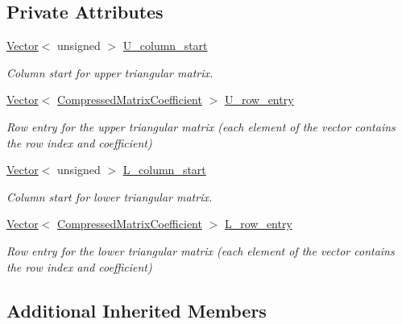 \subsection*{Private Attributes}
\begin{DoxyCompactItemize}
\item 
\hyperlink{classoomph_1_1Vector}{Vector}$<$ unsigned $>$ \hyperlink{classoomph_1_1ILUZeroPreconditioner_3_01CCDoubleMatrix_01_4_af67b6823d2b1bf0e4448405fd0e924bb}{U\+\_\+column\+\_\+start}
\begin{DoxyCompactList}\small\item\em Column start for upper triangular matrix. \end{DoxyCompactList}\item 
\hyperlink{classoomph_1_1Vector}{Vector}$<$ \hyperlink{classoomph_1_1CompressedMatrixCoefficient}{Compressed\+Matrix\+Coefficient} $>$ \hyperlink{classoomph_1_1ILUZeroPreconditioner_3_01CCDoubleMatrix_01_4_a4bcf8f5d9db565fbdb394f2efb2c6d1d}{U\+\_\+row\+\_\+entry}
\begin{DoxyCompactList}\small\item\em Row entry for the upper triangular matrix (each element of the vector contains the row index and coefficient) \end{DoxyCompactList}\item 
\hyperlink{classoomph_1_1Vector}{Vector}$<$ unsigned $>$ \hyperlink{classoomph_1_1ILUZeroPreconditioner_3_01CCDoubleMatrix_01_4_a07aded28d3147ccc1576a8254207b604}{L\+\_\+column\+\_\+start}
\begin{DoxyCompactList}\small\item\em Column start for lower triangular matrix. \end{DoxyCompactList}\item 
\hyperlink{classoomph_1_1Vector}{Vector}$<$ \hyperlink{classoomph_1_1CompressedMatrixCoefficient}{Compressed\+Matrix\+Coefficient} $>$ \hyperlink{classoomph_1_1ILUZeroPreconditioner_3_01CCDoubleMatrix_01_4_ab9856108d5b058bb6b7a03461e59d9bb}{L\+\_\+row\+\_\+entry}
\begin{DoxyCompactList}\small\item\em Row entry for the lower triangular matrix (each element of the vector contains the row index and coefficient) \end{DoxyCompactList}\end{DoxyCompactItemize}
\subsection*{Additional Inherited Members}


